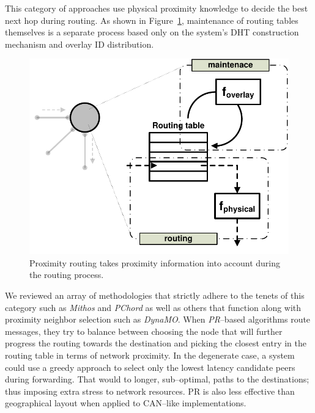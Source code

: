 This category of approaches use physical proximity knowledge to decide the best
next hop during routing. As shown in Figure~\ref{figure:proximity-routing},
maintenance of routing tables themselves is a separate process based only on the
system's DHT construction mechanism and overlay ID distribution.

\begin{figure}[ht]
\centering
  \includegraphics[scale=0.48]{img/pdf/proximity-routing.pdf}
\caption{Proximity routing takes proximity information into account during the
routing process.}
\label{figure:proximity-routing}
\end{figure}
We reviewed an array of methodologies that strictly adhere to 
the tenets of this category such as \emph{Mithos} and
\emph{PChord} as well as others that function along with 
proximity neighbor selection such as \emph{DynaMO}.
When \emph{PR}--based algorithms route messages, they try to balance between
choosing the node that will further progress the routing towards the
destination and picking the closest entry in the routing table
in terms of network proximity. 
In the degenerate case, a system could use a greedy approach to select
only the lowest latency candidate peers during forwarding. That would to
longer, sub--optimal, paths to the destinations; thus imposing
extra stress to network resources. PR is also less
effective than geographical layout when applied to CAN--like implementations.


